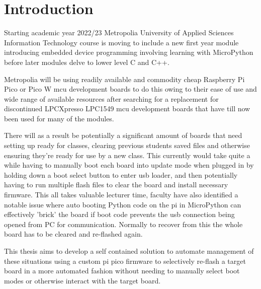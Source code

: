 
\chapter{Introduction}

Starting academic year 2022/23 Metropolia University of Applied Sciences Information Technology course is moving to include a new first year module introducing embedded device programming involving learning with MicroPython before later modules delve to lower level C and C++.

Metropolia will be using readily available and commodity cheap Raspberry Pi Pico or Pico W \gls{mcu}  development boards to do this owing to their ease of use and wide range of available resources after searching for a replacement for discontinued LPCXpresso  LPC1549 \gls{mcu} development boards that have till now been used for many of the modules.

There will as a result be potentially a significant amount of boards that need setting up ready for classes, clearing previous students saved files and otherwise ensuring they're ready for use by a new class. This currently would take quite a while having to manually boot each board into update mode when plugged in by holding down a boot select button to enter \gls{usb} loader, and then potentially having to run multiple flash files to clear the board and install necessary firmware. This all takes valuable lecturer time, faculty have also identified a notable issue where auto booting Python code on the pi in MicroPython can effectively 'brick' the board if boot code prevents the \gls{usb} connection being opened from PC for communication. Normally to recover from this the whole board has to be cleared and re-flashed again.

This thesis aims to develop a self contained solution to automate management of these situations using a custom pi pico firmware to selectively re-flash a target board in a more automated fashion without needing to manually select boot modes or otherwise interact with the target board.